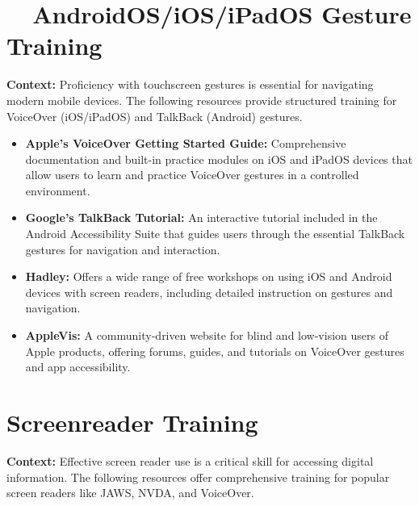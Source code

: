 \section{~~AndroidOS/iOS/iPadOS Gesture Training}\label{app4:gesture-training}

\noindent
\textbf{Context:} Proficiency with touchscreen gestures is essential for navigating modern mobile devices. The following resources provide structured training for VoiceOver (iOS/iPadOS) and TalkBack (Android) gestures.

\begin{itemize}
	\item \textbf{Apple's VoiceOver Getting Started Guide:} Comprehensive documentation and built-in practice modules on iOS and iPadOS devices that allow users to learn and practice VoiceOver gestures in a controlled environment.
	\item \textbf{Google's TalkBack Tutorial:} An interactive tutorial included in the Android Accessibility Suite that guides users through the essential TalkBack gestures for navigation and interaction.
	\item \textbf{Hadley:} Offers a wide range of free workshops on using iOS and Android devices with screen readers, including detailed instruction on gestures and navigation.
	\item \textbf{AppleVis:} A community-driven website for blind and low-vision users of Apple products, offering forums, guides, and tutorials on VoiceOver gestures and app accessibility.
\end{itemize}

\section[Screenreader Training]{Screenreader Training}\label{app4:screenreader-training}

\noindent
\textbf{Context:} Effective screen reader use is a critical skill for accessing digital information. The following resources offer comprehensive training for popular screen readers like JAWS, NVDA, and VoiceOver.

